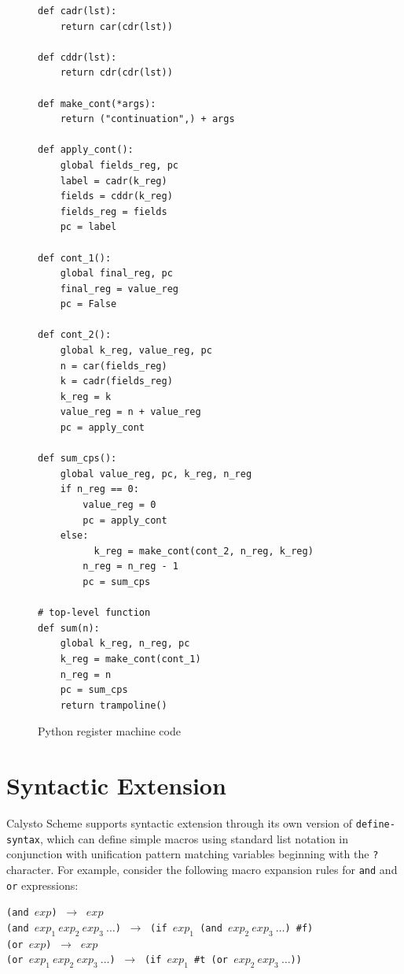 \documentclass[acmsmall,screen,authorversion]{acmart}
\begin{document}
\begin{figure}[h]
\begin{minipage}{0.4\textwidth}
{\begin{verbatim}
def cadr(lst):
    return car(cdr(lst))

def cddr(lst):
    return cdr(cdr(lst))

def make_cont(*args):
    return ("continuation",) + args

def apply_cont():
    global fields_reg, pc
    label = cadr(k_reg)
    fields = cddr(k_reg)
    fields_reg = fields
    pc = label

def cont_1():
    global final_reg, pc
    final_reg = value_reg
    pc = False

def cont_2():
    global k_reg, value_reg, pc
    n = car(fields_reg)
    k = cadr(fields_reg)
    k_reg = k
    value_reg = n + value_reg
    pc = apply_cont

def sum_cps():
    global value_reg, pc, k_reg, n_reg
    if n_reg == 0:
        value_reg = 0
        pc = apply_cont
    else:
          k_reg = make_cont(cont_2, n_reg, k_reg)
        n_reg = n_reg - 1
        pc = sum_cps

# top-level function
def sum(n):
    global k_reg, n_reg, pc
    k_reg = make_cont(cont_1)
    n_reg = n
    pc = sum_cps
    return trampoline()
\end{verbatim}
}
\caption{Python register machine code}
\label{fig:pythonRM}
\end{minipage}
\end{figure}


\section{Syntactic Extension}

\noindent
Calysto Scheme supports syntactic extension through its own version of
\texttt{define-syntax}, which can define simple macros using standard list
notation in conjunction with unification pattern matching variables beginning
with the \texttt{?} character.  For example, consider the following macro
expansion rules for \texttt{and} and \texttt{or} expressions:\\

\begin{minipage}{\textwidth}
\texttt{(and $\mathit{exp}$)} $~\rightarrow~$ $\mathit{exp}$\\
\texttt{(and $\mathit{exp}_1~\mathit{exp}_2~\mathit{exp}_3~\ldots$)} $~\rightarrow~$
\texttt{(if $\mathit{exp}_1$ (and $\mathit{exp}_2~\mathit{exp}_3~\ldots$) \#f)}\\

\texttt{(or $\mathit{exp}$)} $~\rightarrow~$ $\mathit{exp}$\\
\texttt{(or $\mathit{exp}_1~\mathit{exp}_2~\mathit{exp}_3~\ldots$)} $~\rightarrow~$
\texttt{(if $\mathit{exp}_1$ \#t (or $\mathit{exp}_2~\mathit{exp}_3~\ldots$))}\\
\end{minipage}
\end{document}
